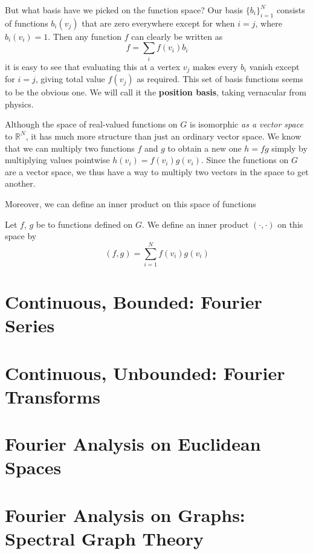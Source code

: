 \documentclass[../master.tex]{subfiles}
\begin{document}
	But what basis have we picked on the function space? Our basis $\{ b_i \}_{i=1}^N$ consists of functions $b_i(v_j)$ that are zero everywhere except for when $i=j$, where $b_i(v_i) = 1$. Then any function $f$ can clearly be written as
	\begin{equation}
		f = \sum_i f(v_i) b_i
	\end{equation}
	it is easy to see that evaluating this at a vertex $v_j$ makes every $b_i$ vanish except for $i=j$, giving total value $f(v_j)$ as required. This set of basis functions seems to be the obvious one. We will call it the \textbf{position basis}, taking vernacular from physics. 
	
	Although the space of real-valued functions on $G$ is isomorphic \emph{as a vector space} to $\mathbb R^N$, it has much more structure than just an ordinary vector space. We know that we can multiply two functions $f$ and $g$ to obtain a new one $h = f g$ simply by multiplying values pointwise $h(v_i) = f(v_i) g(v_i)$. Since the functions on $G$ are a vector space, we thus have a way to multiply two vectors in the space to get another.

	Moreover, we can define an inner product on this space of functions
	
	\begin{defn}
		Let $f$, $g$ be to functions defined on $G$. We define an inner product $(\cdot, \cdot)$ on this space by 
		\begin{equation}
			(f, g) = \sum_{i=1}^N f(v_i) g(v_i)
		\end{equation}
	\end{defn}

\section{Continuous, Bounded: Fourier Series}

\section{Continuous, Unbounded: Fourier Transforms}

\section{Fourier Analysis on Euclidean Spaces}

\section{Fourier Analysis on Graphs: Spectral Graph Theory}
\end{document}
